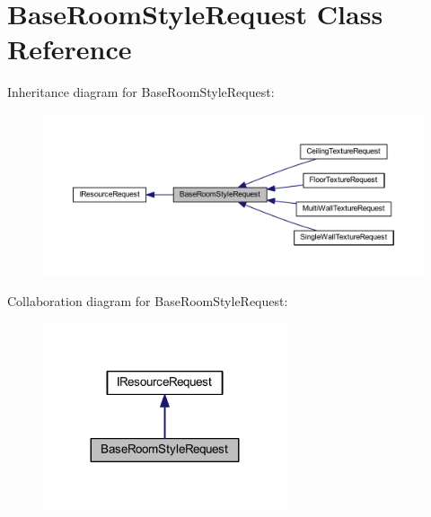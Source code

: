 \hypertarget{class_base_room_style_request}{}\section{Base\+Room\+Style\+Request Class Reference}
\label{class_base_room_style_request}


Inheritance diagram for Base\+Room\+Style\+Request\+:
\nopagebreak
\begin{figure}[H]
\begin{center}
\leavevmode
\includegraphics[width=350pt]{class_base_room_style_request__inherit__graph}
\end{center}
\end{figure}


Collaboration diagram for Base\+Room\+Style\+Request\+:
\nopagebreak
\begin{figure}[H]
\begin{center}
\leavevmode
\includegraphics[width=203pt]{class_base_room_style_request__coll__graph}
\end{center}
\end{figure}
